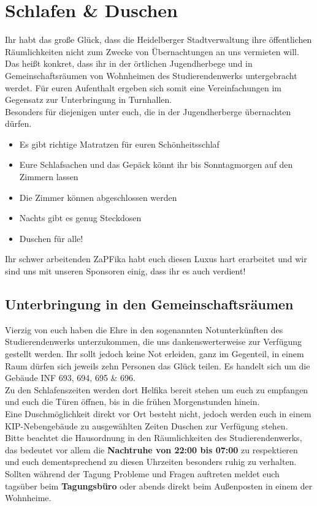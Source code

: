 
\section{Schlafen \& Duschen}
Ihr habt das große Glück, dass die Heidelberger Stadtverwaltung ihre öffentlichen Räumlichkeiten nicht zum Zwecke von Übernachtungen an uns vermieten will. Das heißt konkret, dass ihr in der örtlichen Jugendherbege und in Gemeinschaftsräumen von Wohnheimen des Studierendenwerks untergebracht werdet. Für euren Aufenthalt ergeben sich somit eine Vereinfachungen im Gegensatz zur Unterbringung in Turnhallen.\\
Besonders für diejenigen unter euch, die in der Jugendherberge übernachten dürfen.
\begin{itemize}
  \item Es gibt richtige Matratzen für euren Schönheitsschlaf
  \item Eure Schlafsachen und das Gepäck könnt ihr bis Sonntagmorgen auf den Zimmern lassen
  \item Die Zimmer können abgeschlossen werden
  \item Nachts gibt es genug Steckdosen
  \item Duschen für alle!
\end{itemize}
Ihr schwer arbeitenden ZaPFika habt euch diesen Luxus hart erarbeitet und wir sind uns mit unseren Sponsoren einig, dass ihr es auch verdient! \\

\subsection{Unterbringung in den Gemeinschaftsräumen}
Vierzig von euch haben die Ehre in den sogenannten Notunterkünften des Studierendenwerks unterzukommen, die uns dankenswerterweise zur Verfügung gestellt werden. 
Ihr sollt jedoch keine Not erleiden, ganz im Gegenteil, in einem Raum dürfen sich jeweils zehn Personen das Glück teilen. Es handelt sich um die Gebäude INF 693, 694, 695 \& 696.\\Zu den Schlafenszeiten werden dort Helfika bereit stehen um euch zu empfangen und euch die Türen öffnen, bis in die frühen Morgenstunden hinein.\\
Eine Duschmöglichkeit direkt vor Ort besteht nicht, jedoch werden euch in einem KIP-Nebengebäude zu ausgewählten Zeiten Duschen zur Verfügung stehen.\\
Bitte beachtet die Hausordnung in den Räumlichkeiten des Studierendenwerks, das bedeutet vor allem die \textbf{Nachtruhe von 22:00 bis 07:00} zu respektieren und euch dementsprechend zu diesen Uhrzeiten besonders ruhig zu verhalten.\\
Sollten während der Tagung Probleme und Fragen auftreten meldet euch tagsüber beim  \textbf{Tagungsbüro} oder abends direkt beim Außenposten in einem der Wohnheime.

